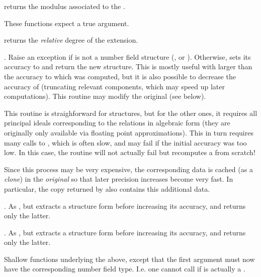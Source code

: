  returns the modulus associated
to the .


These functions expect a true  argument.

 returns the \emph{relative} degree of the
extension.


. Raise an exception if 
is not a number field structure (,  or ).
Otherwise, sets its accuracy to  and return the new structure.
This is mostly useful with  larger than the accuracy to
which  was computed, but it is also possible to decrease the accuracy
of  (truncating relevant components, which may speed up later
computations). This routine may modify the original  (see below).

This routine is straighforward for  structures, but for the
other ones, it requires all principal ideals corresponding to the 
relations in algebraic form (they are originally only available via floating
point approximations). This in turn requires many calls to
, which is often slow, and may fail if the initial
accuracy was too low. In this case, the routine will not actually fail but
recomputes a  from scratch!

Since this process may be very expensive, the corresponding data is cached
(as a \emph{clone}) in the \emph{original}  so that later precision
increases become very fast. In particular, the copy returned by
 also contains this additional data.

. As , but extracts
a  structure form  before increasing its accuracy, and
returns only the latter.

. As , but extracts a
 structure form  before increasing its accuracy, and
returns only the latter.



 Shallow functions
underlying the above, except that the first argument must now have the
corresponding number field type. I.e. one cannot call
 if  is actually a .

